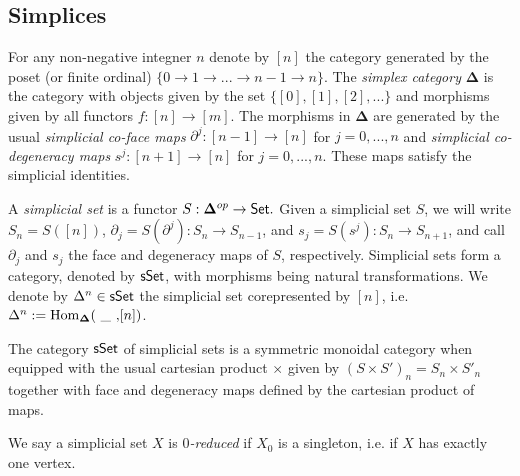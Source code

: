 
\subsection{Simplices} 
For any non-negative integner $n$ denote by $[n]$ the category generated by the poset (or finite ordinal) $\{0 \to 1 \to ... \to n-1 \to n\}$. The \textit{simplex category} $\mathbf{\Delta}$ is the category with objects given by the set $\{ [0], [1], [2], ...\}$ and morphisms given by all functors $f: [n] \to [m]$. The morphisms in $\mathbf{\Delta}$ are generated by the usual
\textit{simplicial co-face maps} $\partial^j: [n-1] \to [n]$ for $j=0,...,n$ and \textit{simplicial co-degeneracy maps} $s^j: [n+1] \to [n]$ for $j=0,...,n.$ These maps satisfy the simplicial identities.

A \textit{simplicial set} is a functor $S: \mathbf{\Delta}^{op} \to \mathsf{Set}.$ Given a simplicial set $S$, we will write $S_n= S( [n] )$, $\partial_j = S( \partial^j): S_n \to S_{n-1}$, and $s_j= S(s^j): S_n \to S_{n+1}$, and call $\partial_j$ and $s_j$ the face and degeneracy maps of $S$, respectively. Simplicial sets form a category, denoted by $\mathsf{sSet}$, with morphisms being natural transformations.  We denote by $\Delta^n \in \mathsf{sSet}$ the simplicial set corepresented by $[n]$, i.e. $\Delta^n:= \mathrm{Hom}_{\mathbf{\Delta}}(\text{ \_ ,}  [n])$. 

The category $\mathsf{sSet}$ of simplicial sets is a symmetric monoidal category when equipped with the usual cartesian product $\times$ given by $(S \times S')_n =S_n \times S'_n$ together with face and degeneracy maps defined by the cartesian product of maps. 

We say a simplicial set $X$ is $0$\textit{-reduced} if $X_0$ is a singleton, i.e. if $X$ has exactly one vertex. 